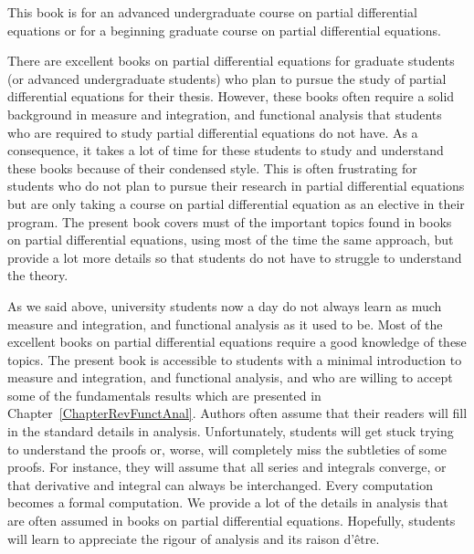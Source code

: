 
This book is for an advanced undergraduate course on partial
differential equations or for a beginning graduate course on partial
differential equations. 

There are excellent books on partial differential equations for
graduate students (or advanced undergraduate students) who plan to
pursue the study of partial differential equations for their 
thesis.  However, these books often require a solid
background in measure and integration, and functional analysis that
students who are required to study partial differential equations do
not have.  As a consequence, it takes a lot of time for these students
to study and understand these books because of their condensed style.
This is often frustrating for students who do not plan to pursue
their research in partial differential equations but are only taking a
course on partial differential equation as an elective in their program.  The
present book covers must of the important topics found in books on
partial differential equations, using most of the time the same 
approach, but provide a lot more details so that students do not have
to struggle to understand the theory.

As we said above,
university students now a day do not always learn as much measure and
integration, and functional analysis as it used to be.  Most of the
excellent books on partial differential equations require a good
knowledge of these topics.  The present book is accessible to
students with a minimal introduction to measure and integration, and
functional analysis, and who are willing to accept some of the
fundamentals results which are presented in
Chapter~\ref{ChapterRevFunctAnal}.  Authors often assume that their
readers will fill in the standard details in analysis.  Unfortunately,
students will get stuck trying to understand the proofs or, worse,
will completely miss the subtleties of some proofs.  For instance,
they will assume
that all series and integrals converge, or that derivative and
integral can always be interchanged.  Every computation becomes a formal
computation.  We provide a lot of the details in
analysis that are often assumed in books on partial differential
equations.  Hopefully, students will learn to appreciate the rigour of
analysis and its raison d'être.

